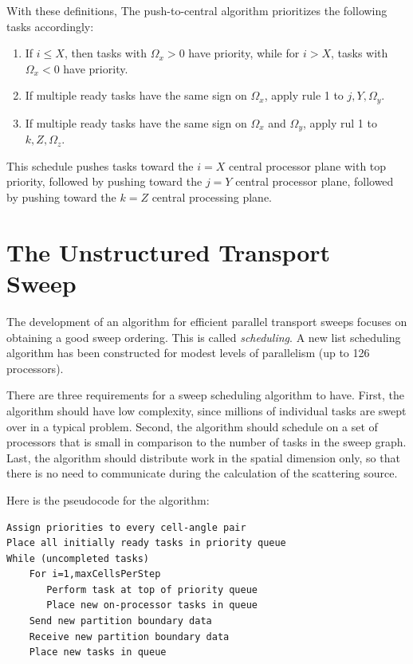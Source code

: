 \documentclass[11pt, letterpaper,titlepage,oneside]{article}
\begin{document}
With these definitions, The push-to-central algorithm prioritizes the following tasks accordingly:
\begin{enumerate}
\item If $i \leq X$, then tasks with $\Omega_x > 0$ have priority, while for $i > X$, tasks with $\Omega_x < 0$ have priority.
\item If multiple ready tasks have the same sign on $\Omega_x$, apply rule 1 to $j,Y,\Omega_y$.
\item If multiple ready tasks have the same sign on $\Omega_x$ and $\Omega_y$, apply rul 1 to $k,Z, \Omega_z$.
\end{enumerate}
This schedule pushes tasks toward the $i = X$ central processor plane with top priority, followed by pushing toward the $j = Y$ central processor plane, followed by pushing toward the $k = Z$ central processing plane\cite{mpadams2013}.


\section*{The Unstructured Transport Sweep}

The development of an algorithm for efficient parallel transport sweeps focuses on obtaining a good sweep ordering. This is called \textit{scheduling}. A new list scheduling algorithm has been constructed for modest levels of parallelism (up to 126 processors).

There are three requirements for a sweep scheduling algorithm to have. First, the algorithm should have low complexity, since millions of individual tasks are swept over in a typical problem. Second, the algorithm should schedule on a set of processors that is small in comparison to the number of tasks in the sweep graph. Last, the algorithm should distribute work in the spatial dimension only, so that there is no need to communicate during the calculation of the scattering source. 

Here is the pseudocode for the algorithm:

\begin{verbatim}
Assign priorities to every cell-angle pair
Place all initially ready tasks in priority queue
While (uncompleted tasks)
    For i=1,maxCellsPerStep
       Perform task at top of priority queue
       Place new on-processor tasks in queue
    Send new partition boundary data
    Receive new partition boundary data
    Place new tasks in queue 
\end{verbatim}
\end{document}
